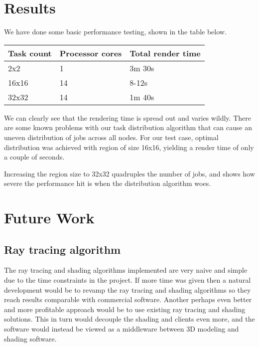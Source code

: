 \chapter{Results}
We have done some basic performance testing, shown in the table below.

\begin{center}
    \begin{tabular}{ | l | l | l |} \hline
    Task count & Processor cores & Total render time \\ \hline
    2x2 & 1 & 3m 30s \\ \hline
    16x16 & 14 & 8-12s \\ \hline
    32x32 & 14 & 1m 40s \\ \hline
    \end{tabular}
\end{center}

We can clearly see that the rendering time is spread out and varies wildly. There are
some known problems with our task distribution algorithm that can cause an uneven distribution
of jobs across all nodes. For our test case, optimal distribution was achieved with region of size 16x16, yielding a render time of only a couple of seconds.

Increasing the region size to 32x32 quadruples the number of jobs, and shows how severe the performance hit is
when the distribution algorithm woes. 

% 

\chapter{Future Work}
\section{Ray tracing algorithm}
The ray tracing and shading algorithms implemented are very naive and simple due to the time constraints in the project. If more time was given then a natural development would be to revamp the ray tracing and shading algorithms so they reach results comparable with commercial software. Another perhaps even better and more profitable approach would be to use existing ray tracing and shading solutions. This in turn would decouple the shading and clients even more, and the software would instead be viewed as a middleware between 3D modeling and shading software.


